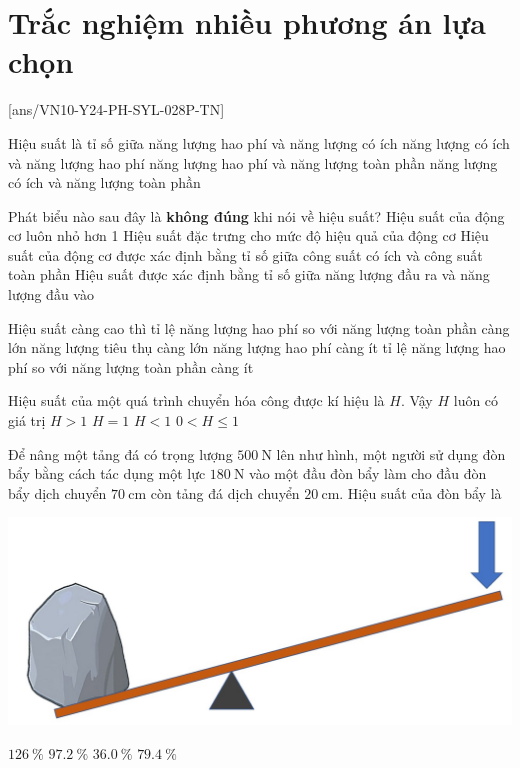 \let\lesson\undefined
\newcommand{\lesson}{\phantomlesson{Bài 16.}}
\setcounter{section}{2}
\section{Trắc nghiệm nhiều phương án lựa chọn}
\setcounter{ex}{0}
[ans/VN10-Y24-PH-SYL-028P-TN]
\begin{ex}
	Hiệu suất là tỉ số giữa
	\choice
	{năng lượng hao phí và năng lượng có ích}
	{năng lượng có ích và năng lượng hao phí}
	{năng lượng hao phí và năng lượng toàn phần}
	{\True năng lượng có ích và năng lượng toàn phần}
	\loigiai{}
\end{ex}
\begin{ex}
Phát biểu nào sau đây là \textbf{không đúng} khi nói về hiệu suất?	
	\choice
	{Hiệu suất của động cơ luôn nhỏ hơn 1}
	{Hiệu suất đặc trưng cho mức độ hiệu quả của động cơ}
	{Hiệu suất của động cơ được xác định bằng tỉ số giữa công suất có ích và công suất toàn phần}
	{\True Hiệu suất được xác định bằng tỉ số giữa năng lượng đầu ra và năng lượng đầu vào}
\end{ex}
\begin{ex}
Hiệu suất càng cao thì	
	\choice
	{tỉ lệ năng lượng hao phí so với năng lượng toàn phần càng lớn}
	{năng lượng tiêu thụ càng lớn}
	{năng lượng hao phí càng ít}
	{\True tỉ lệ năng lượng hao phí so với năng lượng toàn phần càng ít}
	\loigiai{}
\end{ex}
\begin{ex}
Hiệu suất của một quá trình chuyển hóa công được kí hiệu là $H$. Vậy $H$ luôn có giá trị	
	\choice
	{$H>1$}
	{$H=1$}
	{$H<1$}
	{\True $0<H\le 1$}
	\loigiai{}
\end{ex}
\begin{ex}
	Để nâng một tảng đá có trọng lượng $\SI{500}{\newton}$ lên như hình, một người sử dụng đòn bẩy bằng cách tác dụng một lực $\SI{180}{\newton}$ vào một đầu đòn bẩy làm cho đầu đòn bẩy dịch chuyển $\SI{70}{\centi\meter}$ còn tảng đá dịch chuyển $\SI{20}{\centi\meter}$. Hiệu suất của đòn bẩy là
	\begin{center}
		\includegraphics[width=0.4\linewidth]{../figs/VN10-2022-PH-TP023-P-12}
	\end{center}
	\choice
	{$\SI{126}{\percent}$}
	{$\SI{97.2}{\percent}$}
	{$\SI{36.0}{\percent}$}
	{\True $\SI{79.4}{\percent}$}
	\loigiai{}
\end{ex}
